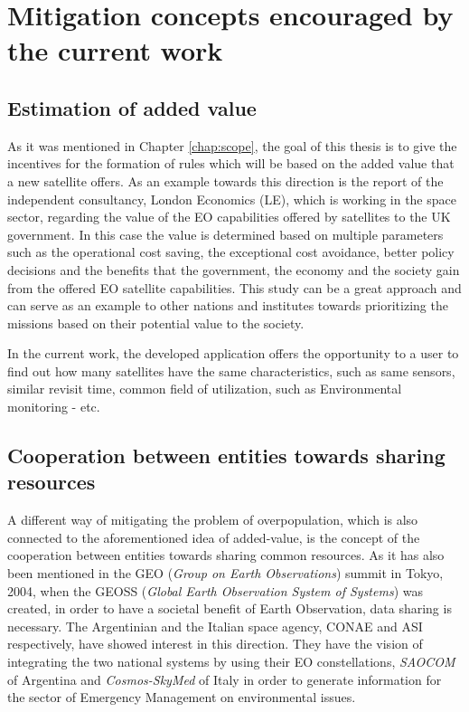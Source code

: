 \bigskip
\section{Mitigation concepts encouraged by the current work}
\label{section}
\bigskip

\subsection{Estimation of added value}
\bigskip
As it was mentioned in Chapter \ref{chap:scope}, the goal of this thesis is to give the incentives for the formation of rules which will be based on the added value that a new satellite offers. As an example towards this direction is the report of the independent consultancy, London Economics (LE), which is working in the space sector, regarding the value of the EO capabilities offered by satellites to the UK government. \cite{Value UK} In this case the value is determined based on multiple parameters such as the operational cost saving, the exceptional cost avoidance, better policy decisions and the benefits that the government, the economy and the society gain from the offered EO satellite capabilities. This study can be a great approach and can serve as an example to other nations and institutes towards prioritizing the missions based on their potential value to the society.

In the current work, the developed application offers the opportunity to a user to find out how many satellites have the same characteristics, such as same sensors, similar revisit time, common field of utilization, such as Environmental monitoring - etc.

\bigskip
\subsection{Cooperation between entities towards sharing resources}
\bigskip

A different way of mitigating the problem of overpopulation, which is also connected to the aforementioned idea of added-value, is the concept of the cooperation between entities towards sharing common resources. As it has also been mentioned in the GEO (\textit{Group on Earth Observations}) summit in Tokyo, 2004, when the GEOSS (\textit{Global Earth Observation System of Systems}) was created, in order to have a societal benefit of Earth Observation, data sharing is necessary. \cite{Kramer 2002} %
The Argentinian and the Italian space agency, CONAE and ASI respectively, have showed interest in this direction. They have the vision of integrating the two national systems by using their EO constellations, \textit{SAOCOM} of Argentina and \textit{Cosmos-SkyMed} of Italy in order to generate information for the sector of Emergency Management on environmental issues. \cite{Cosmos}  %

